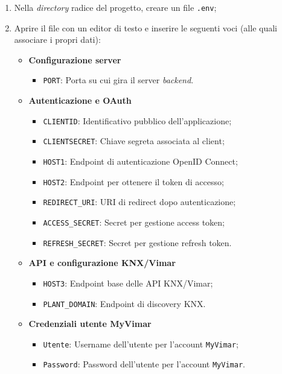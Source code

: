 \documentclass[10pt, letterpaper]{article}
\begin{document}
\begin{enumerate}
    \item Nella \textit{directory} radice del progetto, creare un file \texttt{.env};
    \item Aprire il file con un editor di testo e inserire le seguenti voci (alle quali associare i propri dati):
\begin{itemize}
    \item \textbf{Configurazione server}
    \begin{itemize}
        \item \texttt{PORT}: Porta su cui gira il server \textit{backend}.
    \end{itemize}

    \item \textbf{Autenticazione e OAuth}
    \begin{itemize}
        \item \texttt{CLIENTID}: Identificativo pubblico dell'applicazione;
        \item \texttt{CLIENTSECRET}: Chiave segreta associata al client;
        \item \texttt{HOST1}: Endpoint di autenticazione OpenID Connect;
        \item \texttt{HOST2}: Endpoint per ottenere il token di accesso;
        \item \texttt{REDIRECT\_URI}: URI di redirect dopo autenticazione;
        \item \texttt{ACCESS\_SECRET}: Secret per gestione access token;
        \item \texttt{REFRESH\_SECRET}: Secret per gestione refresh token.
    \end{itemize}

    \item \textbf{API e configurazione KNX/Vimar}
    \begin{itemize}
        \item \texttt{HOST3}: Endpoint base delle API KNX/Vimar;
        \item \texttt{PLANT\_DOMAIN}: Endpoint di discovery KNX.
    \end{itemize}

    \item \textbf{Credenziali utente MyVimar}
    \begin{itemize}
        \item \texttt{Utente}: Username dell'utente per l'account \texttt{MyVimar};
        \item \texttt{Password}: Password dell'utente per l'account \texttt{MyVimar}.
    \end{itemize}


\end{itemize}
\end{enumerate}
\end{document}
